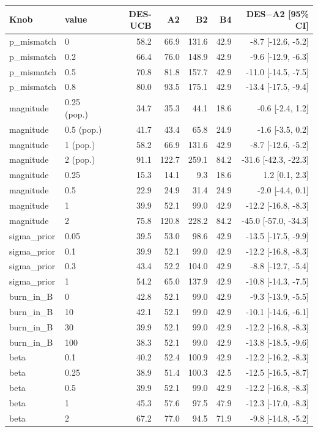 \begin{tabular}{llrrrrr}
\toprule
Knob & value & DES-UCB & A2 & B2 & B4 & DES$-$A2 [95\% CI] \\
\midrule
p\_mismatch & 0 & 58.2 & 66.9 & 131.6 & 42.9 & -8.7 [-12.6, -5.2] \\
p\_mismatch & 0.2 & 66.4 & 76.0 & 148.9 & 42.9 & -9.6 [-12.9, -6.3] \\
p\_mismatch & 0.5 & 70.8 & 81.8 & 157.7 & 42.9 & -11.0 [-14.5, -7.5] \\
p\_mismatch & 0.8 & 80.0 & 93.5 & 175.1 & 42.9 & -13.4 [-17.5, -9.4] \\
magnitude & 0.25 (pop.) & 34.7 & 35.3 & 44.1 & 18.6 & -0.6 [-2.4, 1.2] \\
magnitude & 0.5 (pop.) & 41.7 & 43.4 & 65.8 & 24.9 & -1.6 [-3.5, 0.2] \\
magnitude & 1 (pop.) & 58.2 & 66.9 & 131.6 & 42.9 & -8.7 [-12.6, -5.2] \\
magnitude & 2 (pop.) & 91.1 & 122.7 & 259.1 & 84.2 & -31.6 [-42.3, -22.3] \\
magnitude & 0.25 & 15.3 & 14.1 & 9.3 & 18.6 & 1.2 [0.1, 2.3] \\
magnitude & 0.5 & 22.9 & 24.9 & 31.4 & 24.9 & -2.0 [-4.4, 0.1] \\
magnitude & 1 & 39.9 & 52.1 & 99.0 & 42.9 & -12.2 [-16.8, -8.3] \\
magnitude & 2 & 75.8 & 120.8 & 228.2 & 84.2 & -45.0 [-57.0, -34.3] \\
sigma\_prior & 0.05 & 39.5 & 53.0 & 98.6 & 42.9 & -13.5 [-17.5, -9.9] \\
sigma\_prior & 0.1 & 39.9 & 52.1 & 99.0 & 42.9 & -12.2 [-16.8, -8.3] \\
sigma\_prior & 0.3 & 43.4 & 52.2 & 104.0 & 42.9 & -8.8 [-12.7, -5.4] \\
sigma\_prior & 1 & 54.2 & 65.0 & 137.9 & 42.9 & -10.8 [-14.3, -7.5] \\
burn\_in\_B & 0 & 42.8 & 52.1 & 99.0 & 42.9 & -9.3 [-13.9, -5.5] \\
burn\_in\_B & 10 & 42.1 & 52.1 & 99.0 & 42.9 & -10.1 [-14.6, -6.1] \\
burn\_in\_B & 30 & 39.9 & 52.1 & 99.0 & 42.9 & -12.2 [-16.8, -8.3] \\
burn\_in\_B & 100 & 38.3 & 52.1 & 99.0 & 42.9 & -13.8 [-18.5, -9.6] \\
beta & 0.1 & 40.2 & 52.4 & 100.9 & 42.9 & -12.2 [-16.2, -8.3] \\
beta & 0.25 & 38.9 & 51.4 & 100.3 & 42.5 & -12.5 [-16.5, -8.7] \\
beta & 0.5 & 39.9 & 52.1 & 99.0 & 42.9 & -12.2 [-16.8, -8.3] \\
beta & 1 & 45.3 & 57.6 & 97.5 & 47.9 & -12.3 [-17.0, -8.3] \\
beta & 2 & 67.2 & 77.0 & 94.5 & 71.9 & -9.8 [-14.8, -5.2] \\
\bottomrule
\end{tabular}